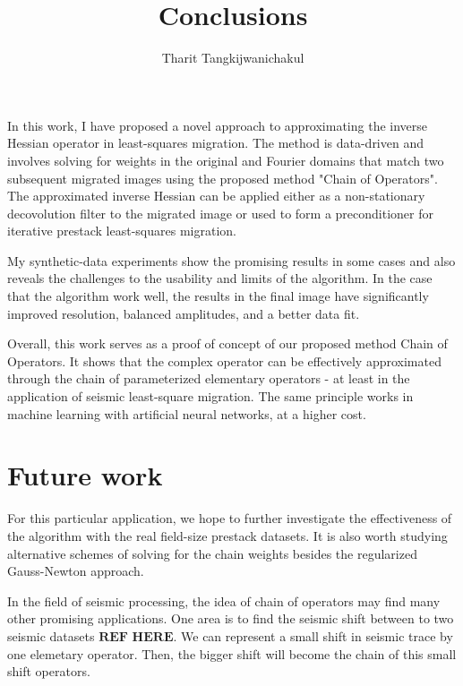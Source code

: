 \title{Conclusions}
\author{Tharit Tangkijwanichakul}
\label{ch:chapter-conclusion}

\maketitle



In this work, I have proposed a novel approach to approximating the inverse Hessian operator in least-squares migration. The method is data-driven and involves solving for weights in the original and Fourier domains that match two subsequent migrated images using the proposed method "Chain of Operators". The approximated inverse Hessian can be applied either as a non-stationary decovolution filter to the migrated image or used to form a preconditioner for iterative prestack least-squares migration.

 My synthetic-data experiments show the promising results in some cases and also reveals the challenges to the usability and limits of the algorithm. In the case that the algorithm work well, the results in the final image have significantly improved resolution, balanced amplitudes, and a better data fit.

 Overall, this work serves as a proof of concept of our proposed method Chain of Operators. It shows that the complex operator can be effectively approximated through the chain of parameterized elementary operators - at least in the application of seismic least-square migration. The same principle works in machine learning with artificial neural networks, at a higher cost.



\section{Future work}
For this particular application, we hope to further investigate the effectiveness of the algorithm with the real field-size prestack datasets. It is also worth studying alternative schemes of solving for the chain weights besides the regularized Gauss-Newton approach.

In the field of seismic processing, the idea of chain of operators may find many other promising applications. One area is to find the seismic shift between to two seismic datasets $\textbf{REF HERE}$. We can represent a small shift in seismic trace by one elemetary operator. Then, the bigger shift will become the chain of this small shift operators.


